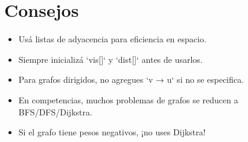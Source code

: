 \section{Consejos}

\begin{itemize}
	\item Usá listas de adyacencia para eficiencia en espacio.
	\item Siempre inicializá `vis[]` y `dist[]` antes de usarlos.
	\item Para grafos dirigidos, no agregues `v → u` si no se especifica.
	\item En competencias, muchos problemas de grafos se reducen a BFS/DFS/Dijkstra.
	\item Si el grafo tiene pesos negativos, ¡no uses Dijkstra!
\end{itemize}
